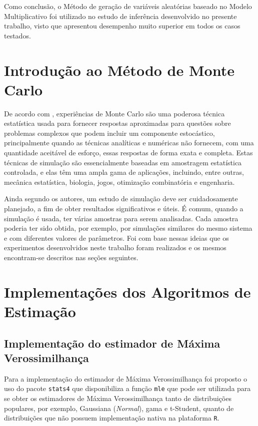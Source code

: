 Como conclusão, o Método de geração de variáveis aleatórias baseado no Modelo Multiplicativo foi utilizado no estudo de inferência desenvolvido no presente trabalho, visto que apresentou desempenho muito superior em todos os casos testados.

\section{Introdução ao Método de Monte Carlo}

De acordo com \citet{busto92}, experiências de Monte Carlo são uma poderosa técnica estatística usada para fornecer respostas aproximadas para questões sobre problemas complexos que podem incluir um componente estocástico, principalmente quando as técnicas analíticas e numéricas não fornecem, com uma quantidade aceitável de esforço, essas respostas de forma exata e completa. Estas técnicas de simulação são essencialmente baseadas em amostragem estatística controlada, e elas têm uma ampla gama de aplicações, incluindo, entre outras, mecânica estatística, biologia, jogos, otimização combinatória e engenharia.

Ainda segundo os autores, um estudo de simulação deve ser cuidadosamente planejado, a fim de obter resultados significativos e úteis. É comum, quando a simulação é usada, ter várias amostras para serem analisadas. Cada amostra poderia ter sido obtida, por exemplo, por simulações similares do mesmo sistema e com diferentes valores de parâmetros. Foi com base nessas ideias que os experimentos desenvolvidos neste trabalho foram realizados e os mesmos encontram-se descritos nas seções seguintes.

\section{Implementações dos Algoritmos de Estimação}

\subsection{Implementação do estimador de Máxima Verossimilhança}

Para a implementação do estimador de Máxima Verossimilhança foi proposto o uso do pacote \texttt{stats4} que disponibiliza a função \texttt{mle} que pode ser utilizada para se obter os estimadores de Máxima Verossimilhança tanto de distribuições populares, por exemplo, Gaussiana (\textit{Normal}), gama e t-Student, quanto de distribuições que não possuem implementação nativa na plataforma \texttt{R}.

